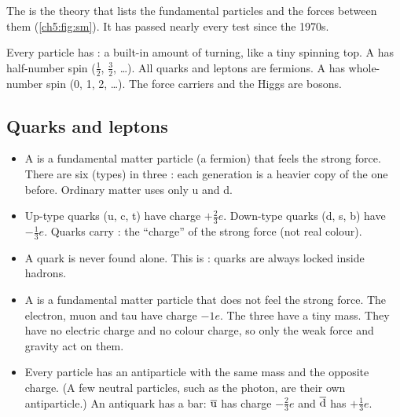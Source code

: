 The  is the theory that lists the fundamental particles and the
forces between them (\cref{ch5:fig:sm}). It has passed nearly every test since the 1970s.

Every particle has : a built-in amount of turning, like a tiny spinning top. A
 has half-number spin ($\tfrac12$, $\tfrac32$, \ldots). All quarks and
leptons are fermions. A  has whole-number spin (0, 1, 2, \ldots). The force
carriers and the Higgs are bosons.

\subsection{Quarks and leptons}

\begin{itemize}
  \item A  is a fundamental matter particle (a fermion) that feels the strong
        force. There are six  (types) in three : each
        generation is a heavier copy of the one before. Ordinary matter uses only u and d.
  \item Up-type quarks (u, c, t) have charge $+\tfrac23 e$. Down-type quarks (d, s, b)
        have $-\tfrac13 e$. Quarks carry : the ``charge'' of the
        strong force (not real colour).
  \item A quark is never found alone. This is : quarks are always locked
        inside hadrons.
  \item A  is a fundamental matter particle that does not feel the strong
        force. The electron, muon and tau have charge $-1e$. The three 
        have a tiny mass. They have no electric charge and no colour charge, so only the
        weak force and gravity act on them.
  \item Every particle has an antiparticle with the same mass and the opposite charge. (A
        few neutral particles, such as the photon, are their own antiparticle.) An
        antiquark has a bar: $\overline{\mathrm{u}}$ has charge $-\tfrac23 e$ and $\overline{\mathrm{d}}$
        has $+\tfrac13 e$.
\end{itemize}

